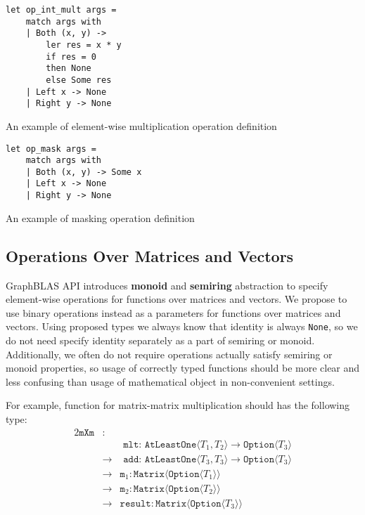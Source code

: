 \begin{listing}[h]
    \begin{verbatim}
let op_int_mult args =
    match args with
    | Both (x, y) -> 
        ler res = x * y 
        if res = 0 
        then None 
        else Some res 
    | Left x -> None
    | Right y -> None
    \end{verbatim}
    \caption{An example of element-wise multiplication operation definition}
    \label{lst:opIntMult}
\end{listing}

\begin{listing}[h]
    \begin{verbatim}
let op_mask args =
    match args with
    | Both (x, y) -> Some x
    | Left x -> None
    | Right y -> None
    \end{verbatim}
    \caption{An example of masking operation definition}
    \label{lst:opMask}
\end{listing}

\subsection{Operations Over Matrices and Vectors}

GraphBLAS API introduces \textbf{monoid} and \textbf{semiring} abstraction to specify element-wise operations for functions over matrices and vectors.
We propose to use binary operations instead as a parameters for functions over matrices and vectors. 
Using proposed types we always know that identity is always \texttt{None}, so we do not need specify identity separately as a part of semiring or monoid.
Additionally, we often do not require operations actually satisfy semiring or monoid properties, so usage of correctly typed functions should be more clear and less confusing than usage of mathematical object in non-convenient settings.

For example, function for matrix-matrix multiplication should has the following type:
\begin{alignat*}{2}
    \texttt{mXm} & : & \\ 
        &   & \texttt{ mlt: AtLeastOne} \langle T_1, T_2 \rangle \to \texttt{Option} \langle T_3 \rangle \\
        & \to & \texttt{ add: AtLeastOne} \langle T_3, T_3 \rangle \to \texttt{Option} \langle T_3 \rangle \\
        & \to & \texttt{m}_1: \texttt{Matrix} \langle \texttt{Option} \langle T_1\rangle \rangle \\
        & \to & \texttt{m}_2: \texttt{Matrix} \langle \texttt{Option} \langle T_2 \rangle \rangle \\
        & \to & \texttt{result}: \texttt{Matrix} \langle \texttt{Option} \langle T_3\rangle \rangle
\end{alignat*}

